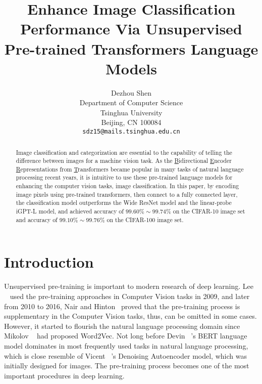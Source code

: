 \documentclass[review]{cvpr}
\begin{document}
\title{Enhance Image Classification Performance Via Unsupervised Pre-trained Transformers Language Models}

\author{Dezhou Shen\\
Department of Computer Science\\
Tsinghua University\\
Beijing, CN 100084\\
{\tt\small sdz15@mails.tsinghua.edu.cn}
}

\maketitle


\begin{abstract}

  Image classification and categorization are essential to the capability of telling the difference between images for a machine vision task.
  As the \underline{B}idirectional \underline{E}ncoder \underline{R}epresentations from \underline{T}ransformers became popular in many tasks of natural language processing recent years,
  it is intuitive to use these pre-trained language models for enhancing the computer vision tasks, \eg image classification.
  In this paper, by encoding image pixels using pre-trained transformers, then connect to a fully connected layer,
  the classification model outperforms the Wide ResNet model and the linear-probe iGPT-L model,
  and achieved accuracy of $99.60\%\sim99.74\%$ on the CIFAR-10 image set and accuracy of $99.10\%\sim99.76\%$ on the CIFAR-100 image set.

\end{abstract}

\section{Introduction}

  Unsupervised pre-training is important to modern research of deep learning.
  Lee \etal~\cite{lee2009convolutional} used the pre-training approaches
  in Computer Vision tasks in 2009, and later from 2010 to 2016,
  Nair and Hinton~\cite{nair2010rectified} proved that the pre-training process is supplementary in the Computer Vision tasks,
  thus, can be omitted in some cases.
  However, it started to flourish the natural language processing domain since Mikolov \etal~\cite{mikolov2013distributed} had proposed Word2Vec.
  Not long before Devin \etal~\cite{devlin2019bert}'s BERT language model dominates in most frequently used tasks in natural language processing,
  which is close resemble of Vicent \etal~\cite{vincent2008extracting}'s Denoising Autoencoder model, which was initially designed for images.
  The pre-training process becomes one of the most important procedures in deep learning.
\end{document}
